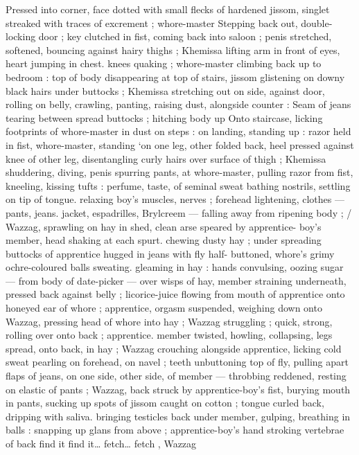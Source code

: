 Pressed into corner, face dotted with small flecks of hardened 
jissom, singlet streaked with traces of excrement ; whore-master 
Stepping back out, double-locking door ; key clutched in fist, coming 
back into saloon ; penis stretched, softened, bouncing against hairy 
thighs ; Khemissa lifting arm in front of eyes, heart jumping in chest. 
knees quaking ; whore-master climbing back up to bedroom : top of 
body disappearing at top of stairs, jissom glistening on downy black 
hairs under buttocks ; Khemissa stretching out on side, against door, 
rolling on belly, crawling, panting, raising dust, alongside counter : 
Seam of jeans tearing between spread buttocks ; hitching body up 
Onto staircase, licking footprints of whore-master in dust on steps : 
on landing, standing up : razor held in fist, whore-master, standing 
‘on one leg, other folded back, heel pressed against knee of other 
leg, disentangling curly hairs over surface of thigh ; Khemissa 
shuddering, diving, penis spurring pants, at whore-master, pulling 
razor from fist, kneeling, kissing tufts : perfume, taste, of seminal 
sweat bathing nostrils, settling on tip of tongue. relaxing boy's 
muscles, nerves ; forehead lightening, clothes --- pants, jeans. 
jacket, espadrilles, Brylcreem --- falling away from ripening body ; {\slash} 
Wazzag, sprawling on hay in shed, clean arse speared by apprentice- 
boy's member, head shaking at each spurt. chewing dusty hay ; 
under spreading buttocks of apprentice hugged in jeans with fly half- 
buttoned, whore's grimy ochre-coloured balls sweating. gleaming in 
hay : hands convulsing, oozing sugar --- from body of date-picker --- 
over wisps of hay, member straining underneath, pressed back 
against belly ; licorice-juice flowing from mouth of apprentice onto 
honeyed ear of whore ; apprentice, orgasm suspended, weighing 
down onto Wazzag, pressing head of whore into hay ; Wazzag 
struggling ; quick, strong, rolling over onto back ; apprentice. 
member twisted, howling, collapsing, legs spread, onto back, in hay 
; Wazzag crouching alongside apprentice, licking cold sweat pearling 
on forehead, on navel ; teeth unbuttoning top of fly, pulling apart 
flaps of jeans, on one side, other side, of member --- throbbing 
reddened, resting on elastic of pants ; Wazzag, back struck by 
apprentice-boy's fist, burying mouth in pants, sucking up spots of 
jissom caught on cotton ; tongue curled back, dripping with saliva. 
bringing testicles back under member, gulping, breathing in balls : 
snapping up glans from above ; apprentice-boy's hand stroking 
vertebrae of back{\td} {\gl} find it{\td} find it{\ldots} fetch{\ldots} fetch{\td} {\gr}, Wazzag 

